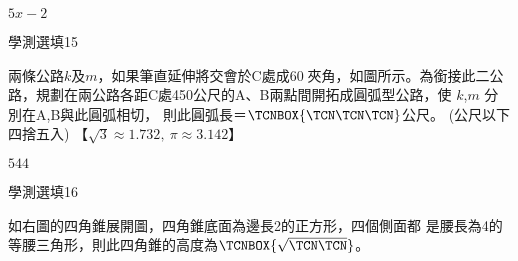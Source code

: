 \begin{QUESTIONS}
\begin{QUESTION}
\begin{QBODY}
        \end{QBODY}
        \begin{QFROMS}
        \end{QFROMS}
        \begin{QTAGS}\end{QTAGS}
        \begin{QANS}
            $5x-2$
        \end{QANS}
        \begin{QSOLLIST}
        \end{QSOLLIST}
        \begin{QEMPTYSPACE}
        \end{QEMPTYSPACE}
    \end{QUESTION}
    \begin{QUESTION}
        \begin{ExamInfo}{90}{學測}{選填}{15}
        \end{ExamInfo}
        \begin{ExamAnsRateInfo}{}{}{}{}
        \end{ExamAnsRateInfo}
        \begin{QBODY}
			兩條公路$k$及$m$，如果筆直延伸將交會於C處成60夾角，如圖所示。為銜接此二公路，規劃在兩公路各距C處450公尺的A、B兩點間開拓成圓弧型公路，使 $k$,$m$ 分別在A,B與此圓弧相切，
則此圓弧長＝$\TCNBOX{\TCN\TCN\TCN}$公尺。
(公尺以下四捨五入)
【$\sqrt{3}\approx 1.732,\ \pi \approx 3.142$】
        \end{QBODY}
        \begin{QFROMS}
        \end{QFROMS}
        \begin{QTAGS}\end{QTAGS}
        \begin{QANS}
            $544$
        \end{QANS}
        \begin{QSOLLIST}
        \end{QSOLLIST}
        \begin{QEMPTYSPACE}
        \end{QEMPTYSPACE}
    \end{QUESTION}
    \begin{QUESTION}
        \begin{ExamInfo}{90}{學測}{選填}{16}
        \end{ExamInfo}
        \begin{ExamAnsRateInfo}{}{}{}{}
        \end{ExamAnsRateInfo}
        \begin{QBODY}
			如右圖的四角錐展開圖，四角錐底面為邊長2的正方形，四個側面都
是腰長為4的等腰三角形，則此四角錐的高度為$\TCNBOX{\sqrt{\TCN\TCN}}$。


\end{QBODY}
\end{QUESTION}
\end{QUESTIONS}
